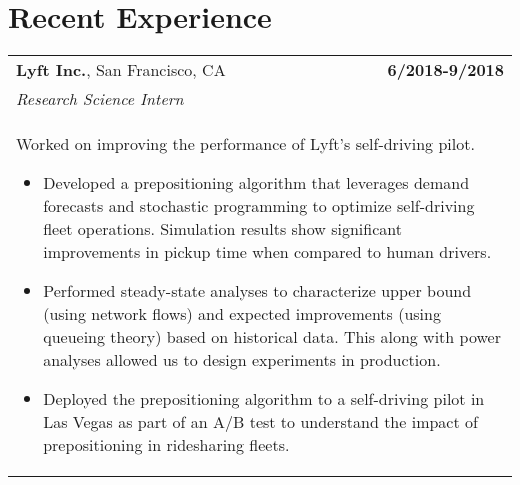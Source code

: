 \documentclass[a4paper,10pt]{article}
\begin{document}
\section{Recent Experience}
\begin{tabularx}{\textwidth}{Xr}

 {\bf{Lyft Inc.}}, San Francisco, CA & \bf{6/2018-9/2018}\\
 \emph{Research Science Intern} &\\
 \multicolumn{2}{p{0.98\textwidth}}{
 Worked on improving the performance of Lyft's self-driving pilot.
 \begin{itemize}
 	\item Developed a prepositioning algorithm that leverages demand forecasts and stochastic programming to optimize self-driving fleet operations. Simulation results show significant improvements in pickup time when compared to human drivers.
 	\item Performed steady-state analyses to characterize upper bound (using network flows) and expected improvements (using queueing theory) based on historical data. This along with power analyses allowed us to design experiments in production.
 	\item Deployed the prepositioning algorithm to a self-driving pilot in Las Vegas as part of an A/B test to understand the impact of prepositioning in ridesharing fleets.%
 \end{itemize}
 }\\


\end{tabularx}
\end{document}
